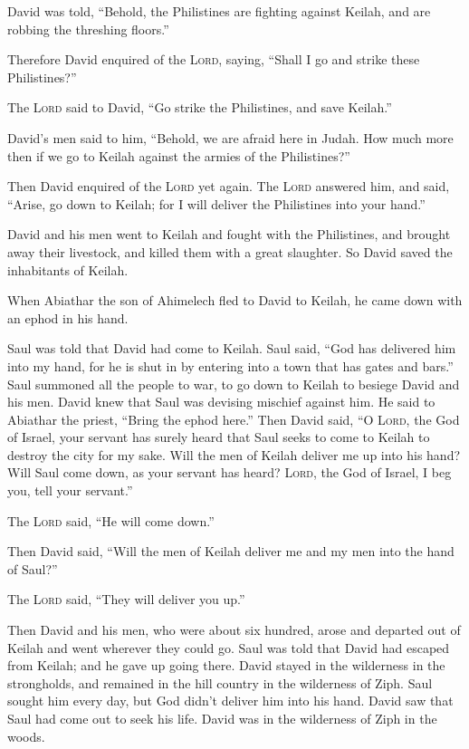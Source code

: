  David was told, ``Behold, the Philistines are fighting
against Keilah, and are robbing the threshing floors.''

 Therefore David enquired of the \textsc{Lord}, saying,
``Shall I go and strike these Philistines?''

The \textsc{Lord} said to David, ``Go strike the Philistines, and save
Keilah.''

 David's men said to him, ``Behold, we are afraid here in
Judah. How much more then if we go to Keilah against the armies of the
Philistines?''

 Then David enquired of the \textsc{Lord} yet again. The
\textsc{Lord} answered him, and said, ``Arise, go down to Keilah; for I
will deliver the Philistines into your hand.''

 David and his men went to Keilah and fought with the
Philistines, and brought away their livestock, and killed them with a
great slaughter. So David saved the inhabitants of Keilah.

 When Abiathar the son of Ahimelech fled to David to
Keilah, he came down with an ephod in his hand.

 Saul was told that David had come to Keilah. Saul said,
``God has delivered him into my hand, for he is shut in by entering into
a town that has gates and bars.''  Saul summoned all the
people to war, to go down to Keilah to besiege David and his men.
 David knew that Saul was devising mischief against him.
He said to Abiathar the priest, ``Bring the ephod here.''
 Then David said, ``O \textsc{Lord}, the God of Israel,
your servant has surely heard that Saul seeks to come to Keilah to
destroy the city for my sake.  Will the men of Keilah
deliver me up into his hand? Will Saul come down, as your servant has
heard? \textsc{Lord}, the God of Israel, I beg you, tell your servant.''

The \textsc{Lord} said, ``He will come down.''

 Then David said, ``Will the men of Keilah deliver me and
my men into the hand of Saul?''

The \textsc{Lord} said, ``They will deliver you up.''

 Then David and his men, who were about six hundred,
arose and departed out of Keilah and went wherever they could go. Saul
was told that David had escaped from Keilah; and he gave up going there.
 David stayed in the wilderness in the strongholds, and
remained in the hill country in the wilderness of Ziph. Saul sought him
every day, but God didn't deliver him into his hand. 
David saw that Saul had come out to seek his life. David was in the
wilderness of Ziph in the woods.


